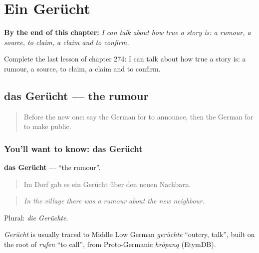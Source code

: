 
\chapter{Ein Gerücht}
\label{ch:ge-ein-gerucht}

\begin{chapteropening}
\textbf{By the end of this chapter:} \emph{I can talk about how true a story is: a rumour, a source, to claim, a claim and to confirm.}

Complete the last lesson of chapter 274: I can talk about how true a story is: a rumour, a source, to claim, a claim and to confirm.
\end{chapteropening}

\section[das Gerücht]{das Gerücht — the rumour}

\label{lesson:GE-C274-geruecht}



\begin{quote}
Before the new one: say the German for to announce, then the German for to make public.
\end{quote}

\subsection*{You'll want to know: das Gerücht}
\textbf{das Gerücht} — \textquotedblleft{}the rumour\textquotedblright{}.

\begin{quote}
Im Dorf gab es ein Gerücht über den neuen Nachbarn.
\end{quote}

\begin{quote}
\emph{In the village there was a rumour about the new neighbour.}
\end{quote}

Plural: \emph{die Gerüchte}.

\begin{cousinweb}
\emph{Gerücht} is usually traced to Middle Low German \emph{gerüchte} \textquotedblleft{}outcry, talk\textquotedblright{}, built on the root of \emph{rufen} \textquotedblleft{}to call\textquotedblright{}, from Proto-Germanic \emph{hrōpaną} (EtymDB).
\end{cousinweb}

